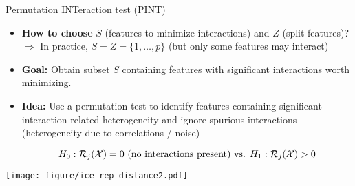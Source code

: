 \documentclass[11pt,compress,t,notes=noshow, aspectratio=169, xcolor=table,dvipsnames]{beamer}
\begin{document}
 \begin{frame}{Permutation INTeraction test (PINT)}
 
\begin{itemize}
   \item \textbf{How to choose} $S$ (features to minimize interactions) and $Z$ (split features)?\\
   $\Rightarrow$ In practice, $S = Z = \{1, \dots, p\}$ (but only some features may interact)
   \item \textbf{Goal:} Obtain subset $S$ containing features with significant interactions worth minimizing.
   \item \textbf{Idea:} %
   Use a permutation test to identify features containing significant interaction-related heterogeneity and ignore spurious interactions (heterogeneity due to correlations / noise)

   $$H_0: \mathcal{R}_j(\mathcal{X}) = 0 \text{ (no interactions present) vs. } H_1: \mathcal{R}_j(\mathcal{X}) > 0$$
   
\end{itemize}

\centering
    \texttt{[image: figure/ice\_rep\_distance2.pdf]}
 \end{frame}
\end{document}
